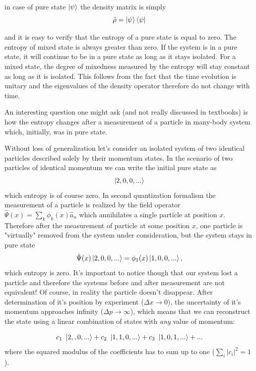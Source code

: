 \documentclass[a4paper,12pt,nofootinbib]{article}
\begin{document}
in case of pure state $\ket{\psi}$ the density matrix is simply
\begin{equation}
  \hat{\rho} = \ket{\psi}\bra{\psi}
\end{equation}

and it is easy to verify that the entropy of a pure state is equal to zero. The entropy of mixed state is always greater than zero.
If the system is in a pure state, it will continue to be in a pure state as long as it stays isolated. For a mixed state, the degree of mixedness measured by the entropy will stay constant as long as it is isolated. This follows from the fact that the time evolution is unitary and the eigenvalues of the density operator therefore do not change with time.

An interesting question one might ask (and not really discussed in textbooks) is how the entropy changes after a measurement of a particle in many-body system which, initially, was in pure state.

Without loss of generalization let's consider an isolated system of two identical particles described solely by their momentum states.
In the scenario of two particles of identical momentum we can write the initial pure state as 
\begin{equation}
  \ket{2,0,0,...}
\end{equation}
which entropy is of course zero.  
In second quantization formalism the measurement of a particle is realized by the field operator $ \hat{\Psi}(x) =\sum_k \phi_k(x)\hat{a}_n$ which annihilates a single particle at position $x$.
Therefore after the measurement of particle at some position $x$, one particle is "virtually" removed from the system under consideration, but the system stays in pure state
\begin{equation}
  \hat{\Psi}(x)\ket{2,0,0,...}=\phi_1(x)\ket{1,0,0,...},
\end{equation}
which entropy is zero. It's important to notice though that our system lost a particle and therefore the systems before and after measurement are not equivalent! Of course, in reality the particle doesn't disappear. After determination of it's position by experiment ($\Delta x \to 0$), the uncertainty of it's momentum approaches infinity ($\Delta p \to \infty$), which means that we can reconstruct the state using a linear combination of states with \textit{any} value of momentum:

\begin{equation}
  c_1\ \ket{2,,0,...}+c_2\ \ket{1,1,0,...}+  c_3\ \ket{1,0,1,...}+...
\end{equation}
where the  squared modulus of the coefficients has to sum up to one ($ \sum_i \left| c_i \right|^2 = 1 $).
\end{document}
